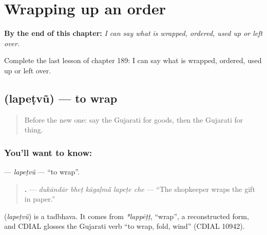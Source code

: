 
\chapter{Wrapping up an order}
\label{ch:gu-wrapping-up-an-order}

\begin{chapteropening}
\textbf{By the end of this chapter:} \emph{I can say what is wrapped, ordered, used up or left over.}

Complete the last lesson of chapter 189: I can say what is wrapped, ordered, used up or left over.
\end{chapteropening}

\section[\texorpdfstring{\gu{લપેટવું} (lapeṭvũ)}{લપેટવું (lapeṭvũ)}]{ (lapeṭvũ) — to wrap}

\label{lesson:GU-C189-lapetvu}



\begin{quote}
Before the new one: say the Gujarati for goods, then the Gujarati for thing.
\end{quote}

\subsection*{You'll want to know: }
\textbf{} — \emph{lapeṭvũ} — \textquotedblleft{}to wrap\textquotedblright{}.

\begin{quote}
\textbf{    .} — \emph{dukāndār bheṭ kāgaḷmā̃ lapeṭe che} — \textquotedblleft{}The shopkeeper wraps the gift in paper.\textquotedblright{}
\end{quote}

\begin{cousinweb}
\textbf{} (\emph{lapeṭvũ}) is a tadbhava. It comes from \emph{*lappēṭṭ}, \textquotedblleft{}wrap\textquotedblright{}, a reconstructed form, and CDIAL glosses the Gujarati verb \textquotedblleft{}to wrap, fold, wind\textquotedblright{} (CDIAL 10942).
\end{cousinweb}

